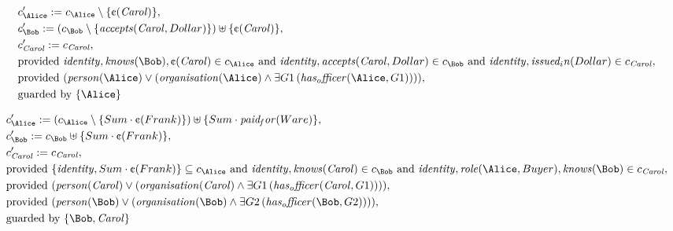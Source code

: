 \begin{align*}
&
c'_
{
\Alice
}
 := 
c_
{
\Alice
}
 \setminus 
\{
\text{\textcent}
(
\mathit{Carol}
)
\}
,\\
&
c'_
{
\Bob
}
 := 
(c_
{
\Bob
}
 \setminus 
\{
\mathit{
accepts
}
(
\mathit{Carol}
,
Dollar
)
\}
) \uplus 
\{
\text{\textcent}
(
\mathit{Carol}
)
\}
,\\
&
c'_
{
\mathit{Carol}
}
 := 
c_
{
\mathit{Carol}
}
,\\
&
\text{provided } 
\mathit{
identity
}
,
\mathit{
knows
}
(
\Bob
)
,
\text{\textcent}
(
\mathit{Carol}
)
 \in c_
{
\Alice
}
 \text{ and } 
\mathit{
identity
}
,
\mathit{
accepts
}
(
\mathit{Carol}
,
Dollar
)
 \in c_
{
\Bob
}
 \text{ and } 
\mathit{
identity
}
,
\mathit{
issued_in
}
(
Dollar
)
 \in c_
{
\mathit{Carol}
}
,\\
&
\text{provided } 
(
\mathit{
person
}
(
\Alice
)
\lor
(
\mathit{
organisation
}
(
\Alice
)
\land
\exists 
G1
\,(
\mathit{
has_officer
}
(
\Alice
,
G1
)
)
)
)
,\\
&
\text{guarded by } \{
\Alice
\}
\end{align*}

\begin{align*}
&
c'_
{
\Alice
}
 := 
(c_
{
\Alice
}
 \setminus 
\{
Sum
\cdot
\text{\textcent}
(
Frank
)
\}
) \uplus 
\{
Sum
\cdot
\mathit{
paid_for
}
(
Ware
)
\}
,\\
&
c'_
{
\Bob
}
 := 
c_
{
\Bob
}
 \uplus 
\{
Sum
\cdot
\text{\textcent}
(
Frank
)
\}
,\\
&
c'_
{
\mathit{Carol}
}
 := 
c_
{
\mathit{Carol}
}
,\\
&
\text{provided } 
\{
\mathit{
identity
}
,
Sum
\cdot
\text{\textcent}
(
Frank
)
\}
 \subseteq c_
{
\Alice
}
 \text{ and } 
\mathit{
identity
}
,
\mathit{
knows
}
(
\mathit{Carol}
)
 \in c_
{
\Bob
}
 \text{ and } 
\mathit{
identity
}
,
\mathit{
role
}
(
\Alice
,
Buyer
)
,
\mathit{
knows
}
(
\Bob
)
 \in c_
{
\mathit{Carol}
}
,\\
&
\text{provided } 
(
\mathit{
person
}
(
\mathit{Carol}
)
\lor
(
\mathit{
organisation
}
(
\mathit{Carol}
)
\land
\exists 
G1
\,(
\mathit{
has_officer
}
(
\mathit{Carol}
,
G1
)
)
)
)
,\\
&
\text{provided } 
(
\mathit{
person
}
(
\Bob
)
\lor
(
\mathit{
organisation
}
(
\Bob
)
\land
\exists 
G2
\,(
\mathit{
has_officer
}
(
\Bob
,
G2
)
)
)
)
,\\
&
\text{guarded by } \{
\Bob
,
\mathit{Carol}
\}
\end{align*}

